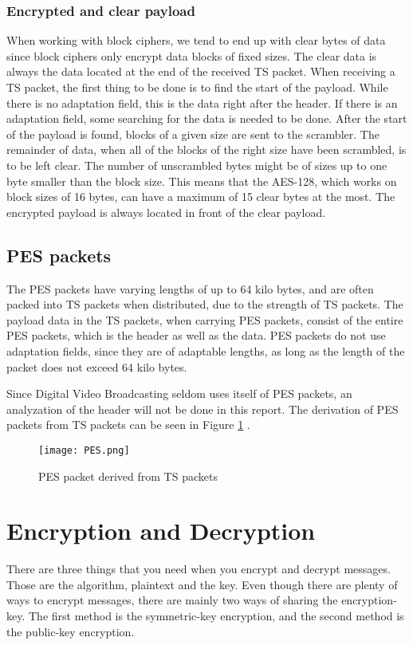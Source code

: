 \subsubsection{Encrypted and clear payload}
When working with block ciphers, we tend to end up with clear bytes of 
data since block ciphers only encrypt data blocks of fixed sizes. 
The clear data is always the data located at the end of the received TS 
packet. When receiving a TS packet, the first thing to be done is to 
find the start of the payload. While there is no adaptation field, this 
is the data right after the header. If there is an adaptation field, 
some searching for the data is needed to be done. After the start of 
the payload is found, blocks of a given size are sent to the scrambler.
The remainder of data, when all of the blocks of the right size have 
been scrambled, is to be left clear. The number of unscrambled bytes 
might be of sizes up to one byte smaller than the block size. This 
means that the AES-128, which works on block sizes of 16 bytes, can 
have a maximum of 15 clear bytes at the most. The encrypted payload is 
always located in front of the clear payload. 
\cite[pp. 10--11]{DVB:2013}

\subsection{PES packets}
The PES packets have varying lengths of up to 64 kilo bytes, and are 
often packed into TS packets when distributed, due to the strength of 
TS packets. The payload data in the TS packets, when carrying PES 
packets, consist of the entire PES packets, which is the header as well 
as the data. PES packets do not use adaptation fields, since they are 
of adaptable lengths, as long as the length of the packet does not 
exceed 64 kilo bytes.

Since Digital Video Broadcasting seldom uses itself of PES packets, an 
analyzation of the header will not be done in this report. The 
derivation of PES packets from TS packets can be seen in Figure 
\ref{img:PES} \citep[p. 9]{ETR:289}.

\begin{figure}[h!]
  \texttt{[image: PES.png]}
  \caption{PES packet derived from TS packets}
  \label{img:PES}
\end{figure}

\section{Encryption and Decryption}
There are three things that you need when you encrypt and decrypt 
messages. Those are the algorithm, plaintext and the key. Even though 
there are plenty of ways to encrypt messages, there are mainly two ways 
of sharing the encryption-key. The first method is the symmetric-key 
encryption, and the second method is the public-key encryption. 


